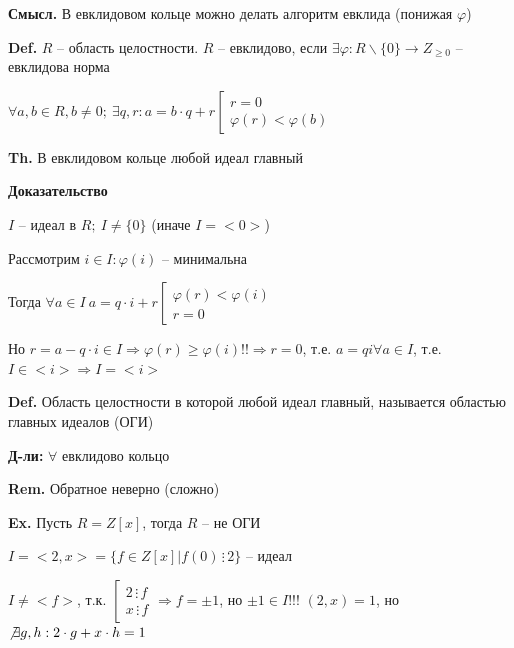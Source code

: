 \documentclass[14pt, letter paper]{article}
\begin{document}
\textbf{Смысл.} В евклидовом кольце можно делать алгоритм евклида (понижая $\varphi$)

\vspace{5mm}

\textbf{Def.} $R$ -- область целостности. $R$ -- евклидово, если $\exists \varphi : R\backslash\{0\} \rightarrow Z_{\geq 0}$ -- евклидова норма

$\forall a, b \in R, b \neq 0;\ \exists q, r : a = b \cdot q + r \left[ \begin{gathered}
    r = 0 \\
    \varphi(r) < \varphi(b)
\end{gathered} \right.$

\textbf{Th.} В евклидовом кольце любой идеал главный

\begin{center}
    \textbf{Доказательство}
\end{center}

$I$ -- идеал в $R;\ I \neq \{0\}$ (иначе $I = <0>$)

Рассмотрим $i \in I : \varphi(i)$ -- минимальна

Тогда $\forall a \in I\ a = q \cdot i + r \left[ \begin{gathered}
    \varphi(r) < \varphi(i) \\
    r = 0
\end{gathered} \right.$

Но $r = a - q \cdot i \in I \Rightarrow \varphi(r) \geq \varphi(i) !! \Rightarrow r = 0$, т.е. $a = qi \forall a \in I$, т.е. $I \in <i> \Rightarrow I = <i>$

\vspace{5mm}

\textbf{Def.} Область целостности в которой любой идеал главный, называется областью главных идеалов (ОГИ)

\textbf{Д-ли:} $\forall$ евклидово кольцо

\textbf{Rem.} Обратное неверно (сложно)

\textbf{Ex.} Пусть $R = Z[x]$, тогда $R$ -- не ОГИ

$I = <2, x> = \{f \in Z[x] | f(0) \, \vdots \, 2\}$ -- идеал

$I \neq <f>$, т.к. $\left[ \begin{gathered}
    2 \, \vdots \, f \\
    x \, \vdots \, f
\end{gathered} \right. \Rightarrow f = \pm 1$, но $\pm 1 \in I!!!$ $(2, x) = 1$, но $\not \exists g, h : 2 \cdot g + x \cdot h = 1$
\end{document}

